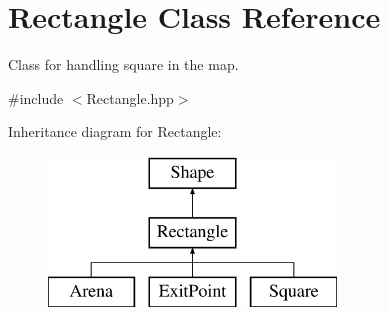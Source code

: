 \hypertarget{class_rectangle}{}\section{Rectangle Class Reference}
\label{class_rectangle}


Class for handling square in the map.  




{\ttfamily \#include $<$Rectangle.\+hpp$>$}

Inheritance diagram for Rectangle\+:\begin{figure}[H]
\begin{center}
\leavevmode
\includegraphics[height=4.000000cm]{class_rectangle}
\end{center}
\end{figure}
